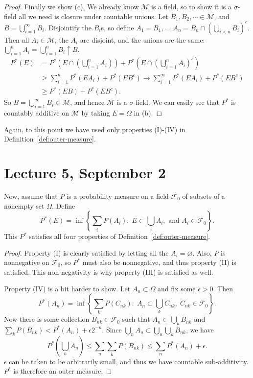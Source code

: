 \documentclass[11pt,fleqn]{book} %
\begin{document}
\begin{proof}
	\vspace{10pt}
	Finally we show (c). We already know $\mathcal{M}$ is a field, so to show it is a $\sigma$-field all we need is closure under countable unions. Let $B_1,B_2,\cdots \in \mathcal{M}$, and $B = \bigcup_{i=1}^\infty B_i$. Disjointify the $B_i$s, so define $A_1 = B_1, \dots, A_n = B_n \cap (\bigcup_{i<n} B_i)^c$. Then all $A_i \in \mathcal{M}$, the $A_i$ are disjoint, and the unions are the same: $\bigcup_{i=1}^n A_i = \bigcup_{i=1}^n B_i \uparrow B$.
	\begin{align*}
		P^*(E) &= P^*\left(E \cap \left(\bigcup_{i=1}^n A_i\right)\right) + P^*\left(E \cap \left(\bigcup_{i=1}^n A_i\right)^c\right) \\
		&\geq \sum_{i=1}^n P^*(EA_i) + P^*(EB^c) \rightarrow \sum_{i=1}^\infty P^*(EA_i) + P^*(EB^c) \tag{taking limit as $n \rightarrow \infty$} \\
		&\geq P^*(EB) + P^*(EB^c) \tag{by property (IV)}.
	\end{align*}
	So $B = \bigcup_{i=1}^\infty B_i \in \mathcal{M}$, and hence $\mathcal{M}$ is a $\sigma$-field. We can easily see that $P^*$ is countably additive on $\mathcal{M}$ by taking $E = \Omega$ in (b).
\end{proof}

Again, to this point we have used only properties (I)-(IV) in Definition~\ref{def:outer-measure}.

\section{Lecture 5, September 2}

Now, assume that $P$ is a probability measure on a field $\mathcal{F}_0$ of subsets of a nonempty set $\Omega$. Define
\[
	P^*(E) = \inf \left\{ \sum_i P(A_i):\;E \subset \bigcup_i A_i, \textrm{ and } A_i \in \mathcal{F}_0 \right\}.
\]
This $P^*$ satisfies all four properties of Definition~\ref{def:outer-measure}.

\begin{proof}
	Property (I) is clearly satisfied by letting all the $A_i = \varnothing$. Also, $P$ is nonnegative on $\mathcal{F}_0$, so $P^*$ must also be nonnegative, and thus property (II) is satisfied. This non-negativity is why property (III) is satisfied as well.

	Property (IV) is a bit harder to show. Let $A_n \subset \Omega$ and fix some $\epsilon > 0$. Then
	\[
		P^*(A_n) = \inf \left\{ \sum_k P(C_{nk}):\;A_n \subset \bigcup_k C_{nk},\;C_{nk} \in \mathcal{F}_0 \right\}.
	\]
	Now there is some collection $B_{nk} \in \mathcal{F}_0$ such that $A_n \subset \bigcup_k B_{nk}$ and $\sum_k P(B_{nk}) < P^*(A_n) + \epsilon 2^{-n}$. Since $\bigcup_n A_n \subset \bigcup_n \bigcup_k B_{nk}$, we have
	\[
		P^*\left(\bigcup_n A_n\right) \leq \sum_n \sum_k P(B_{nk}) \leq \sum_n P^*(A_n) + \epsilon.
	\]
	$\epsilon$ can be taken to be arbitrarily small, and thus we have countable sub-additivity. $P^*$ is therefore an outer measure.
\end{proof}
\end{document}
